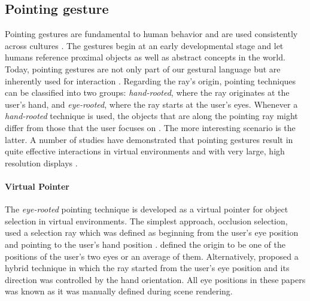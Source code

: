 \subsection{Pointing gesture}
Pointing gestures are fundamental to human behavior \citep{Matthews2012} and are used consistently across cultures  \citep{McNeill2000}. The gestures begin at an early developmental stage \citep{Carpendale2010} and let humans reference proximal objects as well as abstract concepts in the world. Today, pointing gestures are not only part of our gestural language but are inherently used for interaction \citep{Nanayakkara2013a}. Regarding the ray's origin, pointing techniques can be classified into two groups: \textit{hand-rooted}, where the ray originates at the user's hand, and \textit{eye-rooted}, where the ray starts at the user's eyes. Whenever a \textit{hand-rooted} technique is used, the objects that are along the pointing ray might differ from those that the user focuses on \citep{Argelaguet2008}. The more interesting scenario is the latter.
A number of studies have demonstrated that pointing gestures result in quite effective interactions in virtual environments  \citep{Argelaguet2008} and with very large, high resolution displays \citep{Vogel2005}.

\paragraph{Virtual Pointer} The \textit{eye-rooted} pointing technique is developed as a virtual pointer for object selection in virtual environments. The simplest approach, occlusion selection, used a selection ray which was defined as beginning from the user's eye position and pointing to the user's hand position \citep{Forsberg1996,Pierce1997}. \citet{Forsberg1996} defined the origin to be one of the positions of the user's two eyes or an average of them. Alternatively, \citet{Argelaguet2008} proposed a hybrid technique in which the ray started from the user's eye position and its direction was controlled by the hand orientation. All eye positions in these papers was known as it was manually defined during scene rendering.

